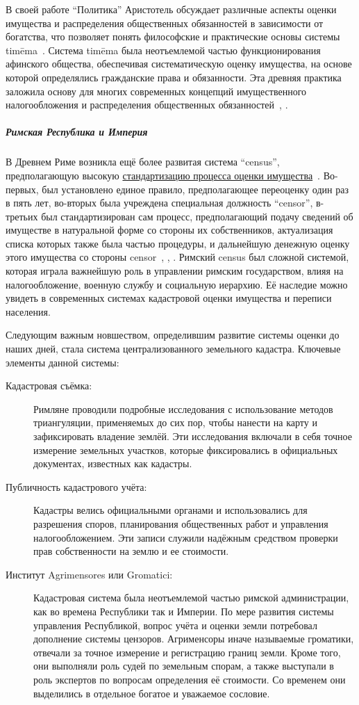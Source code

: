 \documentclass[12pt]{scrartcl}
\begin{document}
В своей работе ``Политика'' Аристотель обсуждает различные аспекты оценки имущества и распределения общественных обязанностей в зависимости от богатства, что позволяет понять философские и практические основы системы tim\={e}ma~\cite{Jowett1885}. Система tim\={e}ma была неотъемлемой частью функционирования афинского общества, обеспечивая систематическую оценку имущества, на основе которой определялись гражданские права и обязанности. Эта древняя практика заложила основу для многих современных концепций имущественного налогообложения и распределения общественных обязанностей~\cite{Hansen1999}, \cite{Finley1983}.

\subparagraph{Римская Республика и Империя}
В Древнем Риме возникла ещё более развитая система ``census'', предполагающую высокую \href{https://www.britannica.com/science/census/Modern-census-procedure}{стандартизацию процесса оценки имущества}~\cite{Britannica:census}. Во-первых, был установлено единое правило, предполагающее переоценку один раз в пять лет, во-вторых была учреждена специальная должность ``censor'', в-третьих был стандартизирован сам процесс, предполагающий подачу сведений об имуществе в натуральной форме со стороны их собственников, актуализация списка которых также была частью процедуры, и дальнейшую денежную оценку этого имущества со стороны censor~\cite{Walbank2006}, \cite{Garnsey2015}, \cite{Livy2002}. Римский census был сложной системой, которая играла важнейшую роль в управлении римским государством, влияя на налогообложение, военную службу и социальную иерархию. Её наследие можно увидеть в современных системах кадастровой оценки имущества и переписи населения.

Следующим важным новшеством, определившим развитие системы оценки до наших дней, стала система централизованного земельного кадастра. Ключевые элементы данной системы:
\begin{description}
    \item[Кадастровая съёмка:] Римляне проводили подробные исследования с использование методов триангуляции, применяемых до сих пор, чтобы нанести на карту и зафиксировать владение землёй. Эти исследования включали в себя точное измерение земельных участков, которые фиксировались в официальных документах, известных как кадастры.
    \item[Публичность кадастрового учёта:] Кадастры велись официальными органами и использовались для разрешения споров, планирования общественных работ и управления налогообложением. Эти записи служили надёжным средством проверки прав собственности на землю и ее стоимости.
    \item[Институт  Agrimensores или Gromatici:] Кадастровая система была неотъемлемой частью римской администрации, как во времена Республики так и Империи. По мере развития системы управления Республикой, вопрос учёта и оценки земли потребовал дополнение системы цензоров. Агрименсоры иначе называемые громатики, отвечали за точное измерение и регистрацию границ земли. Кроме того, они выполняли роль судей по земельным спорам, а также выступали в роль экспертов  по вопросам определения её стоимости. Со временем они выделились в отдельное богатое и уважаемое сословие.
\end{description}
\end{document}
